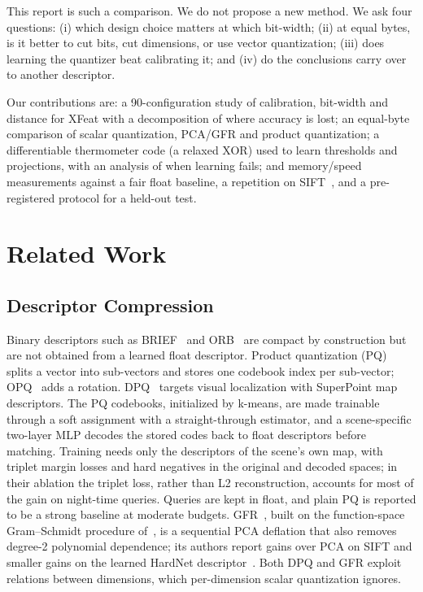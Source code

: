 \documentclass[10pt,conference]{IEEEtran}
\begin{document}
This report is such a comparison. We do not propose a new method. We ask four questions: (i) which design choice matters at which bit-width; (ii) at equal bytes, is it better to cut bits, cut dimensions, or use vector quantization; (iii) does learning the quantizer beat calibrating it; and (iv) do the conclusions carry over to another descriptor.

Our contributions are: a 90-configuration study of calibration, bit-width and distance for XFeat with a decomposition of where accuracy is lost; an equal-byte comparison of scalar quantization, PCA/GFR and product quantization; a differentiable thermometer code (a relaxed XOR) used to learn thresholds and projections, with an analysis of when learning fails; and memory/speed measurements against a fair float baseline, a repetition on SIFT~\cite{sift}, and a pre-registered protocol for a held-out test.

\section{Related Work}
\subsection{Descriptor Compression}
Binary descriptors such as BRIEF~\cite{brief} and ORB~\cite{orb} are compact by construction but are not obtained from a learned float descriptor. Product quantization (PQ)~\cite{pq} splits a vector into sub-vectors and stores one codebook index per sub-vector; OPQ~\cite{opq} adds a rotation. DPQ~\cite{dpq} targets visual localization with SuperPoint map descriptors. The PQ codebooks, initialized by k-means, are made trainable through a soft assignment with a straight-through estimator, and a scene-specific two-layer MLP decodes the stored codes back to float descriptors before matching. Training needs only the descriptors of the scene's own map, with triplet margin losses and hard negatives in the original and decoded spaces; in their ablation the triplet loss, rather than L2 reconstruction, accounts for most of the gain on night-time queries. Queries are kept in float, and plain PQ is reported to be a strong baseline at moderate budgets. GFR~\cite{gfr}, built on the function-space Gram--Schmidt procedure of~\cite{gfrorig}, is a sequential PCA deflation that also removes degree-2 polynomial dependence; its authors report gains over PCA on SIFT and smaller gains on the learned HardNet descriptor~\cite{hardnet}. Both DPQ and GFR exploit relations between dimensions, which per-dimension scalar quantization ignores.
\end{document}
